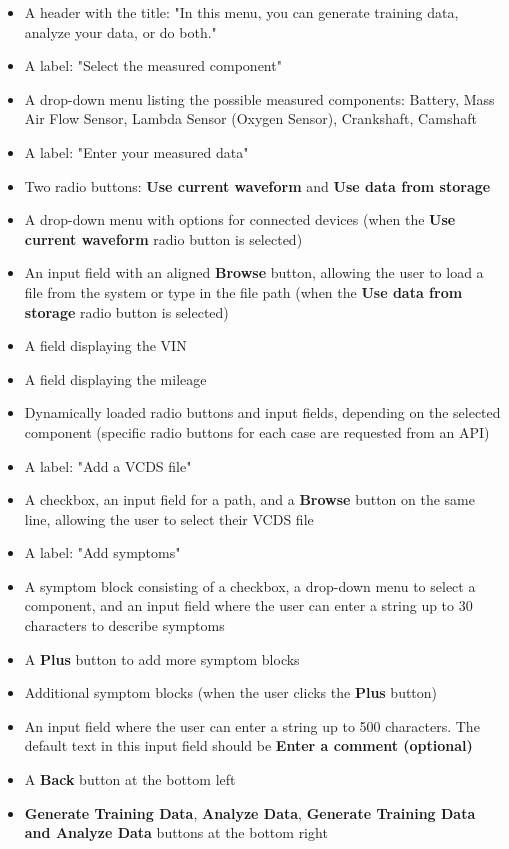 \documentclass[]{scrreprt}
\begin{document}
\begin{itemize}
    \item A header with the title: "In this menu, you can generate training data, analyze your data, or do both."
    \item A label: "Select the measured component"
    \item A drop-down menu listing the possible measured components: Battery, Mass Air Flow Sensor, Lambda Sensor (Oxygen Sensor), Crankshaft, Camshaft
    \item A label: "Enter your measured data"
    \item Two radio buttons: \textbf{Use current waveform} and \textbf{Use data from storage}
    \item A drop-down menu with options for connected devices (when the \textbf{Use current waveform} radio button is selected)
    \item An input field with an aligned \textbf{Browse} button, allowing the user to load a file from the system or type in the file path (when the \textbf{Use data from storage} radio button is selected)
    \item A field displaying the VIN
    \item A field displaying the mileage
    \item Dynamically loaded radio buttons and input fields, depending on the selected component (specific radio buttons for each case are requested from an API)
    \item A label: "Add a VCDS file"
    \item A checkbox, an input field for a path, and a \textbf{Browse} button on the same line, allowing the user to select their VCDS file
    \item A label: "Add symptoms"
    \item A symptom block consisting of a checkbox, a drop-down menu to select a component, and an input field where the user can enter a string up to 30 characters to describe symptoms
    \item A \textbf{Plus} button to add more symptom blocks
    \item Additional symptom blocks (when the user clicks the \textbf{Plus} button)
    \item An input field where the user can enter a string up to 500 characters. The default text in this input field should be \textbf{Enter a comment (optional)}
    \item A \textbf{Back} button at the bottom left
    \item \textbf{Generate Training Data}, \textbf{Analyze Data}, \textbf{Generate Training Data and Analyze Data} buttons at the bottom right
\end{itemize}
\end{document}

